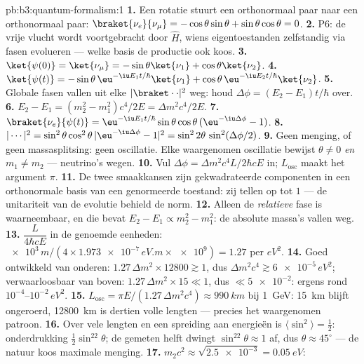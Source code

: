 \begin{solution}{pb:b3:quantum-formalism:1}
\textbf{1.} Een rotatie stuurt een orthonormaal paar naar een
orthonormaal paar: $\braket{\nu_e}{\nu_\mu} = -\cos\theta\sin\theta +
\sin\theta\cos\theta = 0$.
\textbf{2.} P6: de vrije vlucht wordt voortgebracht door $\hat H$, wiens
eigentoestanden zelfstandig via fasen evolueren --- welke basis de
productie ook koos.
\textbf{3.} $\ket{\psi(0)} = \ket{\nu_\mu} = -\sin\theta\ket{\nu_1}
+ \cos\theta\ket{\nu_2}$.
\textbf{4.} $\ket{\psi(t)} = -\sin\theta\,\eu^{-\iu E_1t/\hbar}
\ket{\nu_1} + \cos\theta\,\eu^{-\iu E_2t/\hbar}\ket{\nu_2}$.
\textbf{5.} Globale fasen vallen uit elke $|\braket\cdot\cdot|^2$ weg:
houd $\Delta\phi = (E_2 - E_1)t/\hbar$ over.
\textbf{6.} $E_2 - E_1 = (m_2^2 - m_1^2)c^4/2E = \Delta m^2c^4/2E$.
\textbf{7.} $\braket{\nu_e}{\psi(t)} = \eu^{-\iu E_1t/\hbar}
\sin\theta\cos\theta\,(\eu^{-\iu\Delta\phi} - 1)$.
\textbf{8.} $|\cdots|^2 = \sin^2\theta\cos^2\theta\,|{\eu^{-\iu
\Delta\phi} - 1}|^2 = \sin^22\theta\,\sin^2(\Delta\phi/2)$.
\textbf{9.} Geen menging, of geen massasplitsing: geen oscillatie. Elke
waargenomen oscillatie bewijst $\theta \neq 0$ \emph{en} $m_1 \neq
m_2$ --- neutrino's wegen.
\textbf{10.} Vul $\Delta\phi = \Delta m^2c^4L/2\hbar cE$ in;
$L_{\text{osc}}$ maakt het argument $\pi$.
\textbf{11.} De twee smaakkansen zijn gekwadrateerde componenten in een
orthonormale basis van een genormeerde toestand: zij tellen op tot $1$
--- de unitariteit van de evolutie behield de norm.
\textbf{12.} Alleen de \emph{relatieve} fase is waarneembaar, en die
bevat $E_2 - E_1 \propto m_2^2 - m_1^2$: de absolute massa's vallen weg.
\textbf{13.} $\dfrac{L}{4\hbar cE}$ in de genoemde eenheden:
$\num{e3}\,\unit{m}/(4 \times \num{1.973e-7}\,\unit{eV.m} \times
\num{e9}) = 1.27$ per $\unit{eV^2}$.
\textbf{14.} Goed ontwikkeld van onderen: $1.27\,\Delta m^2 \times 12800
\gtrsim 1$, dus $\Delta m^2c^4 \gtrsim \num{6e-5}\,\unit{eV^2}$;
verwaarloosbaar van boven: $1.27\,\Delta m^2 \times 15 \ll 1$, dus $\ll
\num{5e-2}$: ergens rond $10^{-4}$--$10^{-2}\,\unit{eV^2}$.
\textbf{15.} $L_{\text{osc}} = \pi E/(1.27\,\Delta m^2c^4) \approx
\qty{990}{km}$ bij \qty{1}{GeV}: \qty{15}{km} blijft ongeroerd,
\qty{12800}{km} is dertien volle lengten --- precies het waargenomen
patroon.
\textbf{16.} Over vele lengten en een spreiding aan energieën is
$\langle\sin^2\rangle = \tfrac12$: onderdrukking $\tfrac12\sin^22
\theta$; de gemeten helft dwingt $\sin^22\theta \approx 1$ af, dus
$\theta \approx 45^\circ$ --- de natuur koos maximale menging.
\textbf{17.} $m_2c^2 \approx \sqrt{\num{2.5e-3}} = \qty{0.05}{eV}$:

\end{solution}
